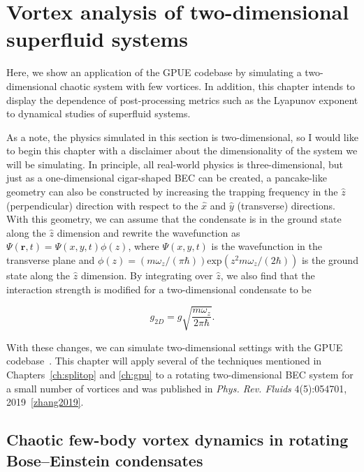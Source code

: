 \chapter{Vortex analysis of two-dimensional superfluid systems}
\label{ch:2d}

Here, we show an application of the GPUE codebase by simulating a two-dimensional chaotic system with few vortices.
In addition, this chapter intends to display the dependence of post-processing metrics such as the Lyapunov exponent to dynamical studies of superfluid systems.

As a note, the physics simulated in this section is two-dimensional, so I would like to begin this chapter with a disclaimer about the dimensionality of the system we will be simulating.
In principle, all real-world physics is three-dimensional, but just as a one-dimensional cigar-shaped BEC can be created, a pancake-like geometry can also be constructed by increasing the trapping frequency in the $\hat z$ (perpendicular) direction with respect to the $\hat x$ and $\hat y$ (transverse) directions.
With this geometry, we can assume that the condensate is in the ground state along the $\hat z$ dimension and rewrite the wavefunction as $\Psi(\mathbf{r},t) = \Psi(x, y, t)\phi(z)$, where $\Psi(x, y, t)$ is the wavefunction in the transverse plane and $\phi(z) = (m \omega_z/(\pi\hbar))\text{exp}(z^2 m\omega_z/(2\hbar))$ is the ground state along the $\hat z$ dimension.
By integrating over $\hat z$, we also find that the interaction strength is modified for a two-dimensional condensate to be

\begin{equation}
g_{2D} = g \sqrt{\frac{m\omega_z}{2\pi\hbar}}.
\end{equation}

\noindent With these changes, we can simulate two-dimensional settings with the GPUE codebase~\cite{zhang2019, o2017, o2016topo, o2016}.
This chapter will apply several of the techniques mentioned in Chapters~\ref{ch:splitop} and \ref{ch:gpu} to a rotating two-dimensional BEC system for a small number of vortices and was published in \textit{Phys. Rev. Fluids} 4(5):054701, 2019~\ref{zhang2019}.

\section{Chaotic few-body vortex dynamics in rotating Bose--Einstein condensates}

